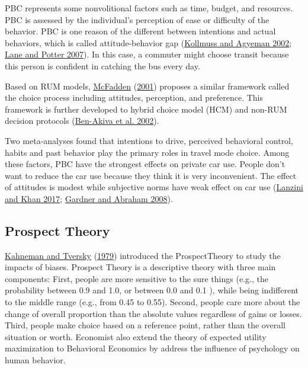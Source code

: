 \documentclass[
  11pt,
  openany]{memoir}
\begin{document}
PBC represents some nonvolitional factors such as time, budget, and resources. PBC is assessed by the individual's perception of ease or difficulty of the behavior. PBC is one reason of the different between intentions and actual behaviors, which is called attitude-behavior gap (\protect\hyperlink{ref-kollmussMindGapWhy2002}{Kollmuss and Agyeman 2002}; \protect\hyperlink{ref-laneAdoptionCleanerVehicles2007}{Lane and Potter 2007}). In this case, a commuter might choose transit because this person is confident in catching the bus every day.

Based on RUM models, \protect\hyperlink{ref-mcfaddenEconomicChoices2001}{McFadden} (\protect\hyperlink{ref-mcfaddenEconomicChoices2001}{2001}) proposes a similar framework called the choice process including attitudes, perception, and preference. This framework is further developed to hybrid choice model (HCM) and non-RUM decision protocols (\protect\hyperlink{ref-ben-akivaHybridChoiceModels2002}{Ben-Akiva et al. 2002}).

Two meta-analyses found that intentions to drive, perceived behavioral control, habits and past behavior play the primary roles in travel mode choice. Among these factors, PBC have the strongest effects on private car use. People don't want to reduce the car use because they think it is very inconvenient. The effect of attitudes is modest while subjective norms have weak effect on car use (\protect\hyperlink{ref-lanziniSheddingLightPsychological2017}{Lanzini and Khan 2017}; \protect\hyperlink{ref-gardnerPsychologicalCorrelatesCar2008}{Gardner and Abraham 2008}).

\hypertarget{prospect-theory}{%
\subsection{Prospect Theory}\label{prospect-theory}}

\protect\hyperlink{ref-kahnemanProspectTheoryAnalysis1979a}{Kahneman and Tversky} (\protect\hyperlink{ref-kahnemanProspectTheoryAnalysis1979a}{1979}) introduced the ProspectTheory to study the impacts of biases. Prospect Theory is a descriptive theory with three main components: First, people are more sensitive to the sure things (e.g., the probability between 0.9 and 1.0, or between 0.0 and 0.1 ), while being indifferent to the middle range (e.g., from 0.45 to 0.55). Second, people care more about the change of overall proportion than the absolute values regardless of gains or losses. Third, people make choice based on a reference point, rather than the overall situation or worth. Economist also extend the theory of expected utility maximization to Behavioral Economics by address the influence of psychology on human behavior.
\end{document}
